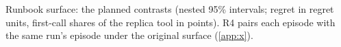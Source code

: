 \begin{table}[!htbp]
\centering
\caption{Runbook surface: the planned contrasts (nested 95\% intervals; regret in regret units, first-call shares of the replica tool in points). R4 pairs each episode with the same run's episode under the original surface (\cref{app:x}).}
\label{tab:r-contrasts}
\scriptsize\setlength{\tabcolsep}{3pt}
\resizebox{\linewidth}{!}{}
\end{table}
